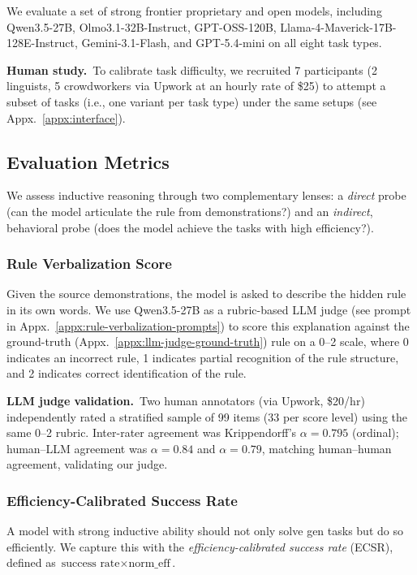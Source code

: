 \documentclass[11pt]{article}
\begin{document}
We evaluate a set of strong frontier proprietary and open models, including Qwen3.5-27B, Olmo3.1-32B-Instruct, GPT-OSS-120B, Llama-4-Maverick-17B-128E-Instruct, Gemini-3.1-Flash, and GPT-5.4-mini on all eight task types.

\noindent\textbf{Human study.}~To calibrate task difficulty, we recruited 7 participants (2 linguists, 5 crowdworkers via Upwork at an hourly rate of \$25) to attempt a subset of tasks (i.e., one variant per task type) under the same setups (see Appx.~\ref{appx:interface}).

\subsection{Evaluation Metrics}

We assess inductive reasoning through two complementary lenses: a \emph{direct} probe (can the model articulate the rule from demonstrations?) and an \emph{indirect}, behavioral probe (does the model achieve the tasks with high efficiency?).

\subsubsection{Rule Verbalization Score}
Given the source demonstrations, the model is asked to describe the hidden rule in its own words.
We use Qwen3.5-27B as a rubric-based LLM judge (see prompt in Appx.~\ref{appx:rule-verbalization-prompts}) to score this explanation against the ground-truth (Appx.~\ref{appx:llm-judge-ground-truth}) rule on a 0--2 scale, where 0 indicates an incorrect rule, 1 indicates partial recognition of the rule structure, and 2 indicates correct identification of the rule.

\noindent\textbf{LLM judge validation.}~Two human annotators (via Upwork, \$20/hr) independently rated a stratified sample of 99 items (33 per score level) using the same 0--2 rubric.
Inter-rater agreement was Krippendorff's $\alpha = 0.795$ (ordinal); human--LLM agreement was $\alpha = 0.84$ and $\alpha = 0.79$, matching human--human agreement, validating our judge.

\subsubsection{Efficiency-Calibrated Success Rate}
A model with strong inductive ability should not only solve gen tasks but do so efficiently. We capture this with the \emph{efficiency-calibrated success rate} (ECSR), defined as \textbf{$\text{success rate} \times \text{norm\_eff}$}.
\end{document}
